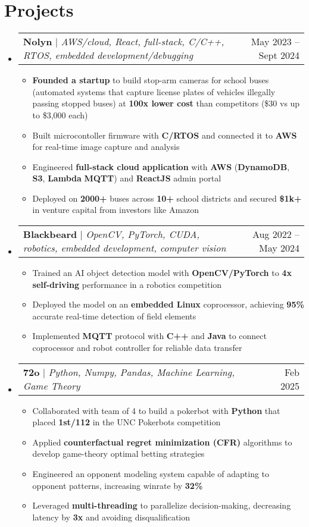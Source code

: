 \documentclass[letterpaper,11pt]{article}
\makeatletter
\newcommand{\resumeItem}[1]{
  \item\small{
    {#1 \vspace{-2pt}}}
}
\newcommand{\resumeProjectHeading}[2]{
    \item
    \begin{tabular*}{0.97\textwidth}{l@{\extracolsep{\fill}}r}
      #1 & #2 \\
    \end{tabular*}
    \vspace{-7pt}
}
\newcommand{\resumeSubHeadingListStart}{\begin{itemize}[leftmargin=0.15in, label={}]}
\newcommand{\resumeSubHeadingListEnd}{\end{itemize}}
\newcommand{\resumeItemListStart}{\begin{itemize}[leftmargin=0.15in]}
\newcommand{\resumeItemListEnd}{\end{itemize}\vspace{-5pt}}
\makeatother
\begin{document}
\section{Projects}
    \resumeSubHeadingListStart
      \resumeProjectHeading
          {\textbf{Nolyn} $|$ \emph{AWS/cloud, React, full-stack, C/C++, RTOS, embedded development/debugging}}{ May 2023 -- Sept 2024}
          \resumeItemListStart
            \resumeItem{\textbf{Founded a startup} to build stop-arm cameras for school buses (automated systems that capture license plates of vehicles illegally passing stopped buses) at \textbf{100x lower cost} than competitors (\$30 vs up to \$3,000 each)}
            \resumeItem{Built microcontoller firmware with \textbf{C/RTOS} and connected it to \textbf{AWS} for real-time image capture and analysis}
            \resumeItem{Engineered \textbf{full-stack cloud application} with \textbf{AWS} (\textbf{DynamoDB}, \textbf{S3}, \textbf{Lambda} \textbf{MQTT}) and \textbf{ReactJS} admin portal}
            \resumeItem{Deployed on \textbf{2000+} buses across \textbf{10+} school districts and secured \textbf{\$1k+} in venture capital from investors like Amazon}
          \resumeItemListEnd
      \resumeProjectHeading
        {\textbf{Blackbeard} $|$ \emph{OpenCV, PyTorch, CUDA, robotics, embedded development, computer vision}}{Aug 2022 -- May 2024}
        \resumeItemListStart
          \resumeItem{Trained an AI object detection model with \textbf{OpenCV/PyTorch} to \textbf{4x} \textbf{self-driving} performance in a robotics competition}
          \resumeItem{Deployed the model on an \textbf{embedded Linux} coprocessor, achieving \textbf{95\%} accurate real-time detection of field elements}
          \resumeItem{Implemented \textbf{MQTT} protocol with \textbf{C++} and \textbf{Java} to connect coprocessor and robot controller for reliable data transfer}
        \resumeItemListEnd
        \resumeProjectHeading
          {\textbf{72o} $|$ \emph{Python, Numpy, Pandas, Machine Learning, Game Theory}}{Feb 2025}
          \resumeItemListStart
            \resumeItem{Collaborated with team of 4 to build a pokerbot with \textbf{Python} that placed \textbf{1st/112} in the UNC Pokerbots competition}
            \resumeItem{Applied \textbf{counterfactual regret minimization (CFR)} algorithms to develop game-theory optimal betting strategies}
            \resumeItem{Engineered an opponent modeling system capable of adapting to opponent patterns, increasing winrate by \textbf{32\%}}
            \resumeItem{Leveraged \textbf{multi-threading} to parallelize decision-making, decreasing latency by \textbf{3x} and avoiding disqualification}
          \resumeItemListEnd
    \resumeSubHeadingListEnd
\end{document}
